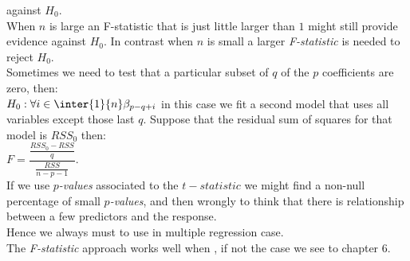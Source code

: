 against $H_{0}$.\\When $n$ is large an F-statistic that is just little
larger than $1$ might still provide evidence against $H_{0}$. In 
contrast when $n$ is small a larger \emph{F-statistic} is needed to
reject $H_{0}$.\\
Sometimes we need to test that a particular subset of $q$ of the $p$
coefficients are zero, then:\\$H_{0}:\forall i\in\inter{1}{n} 
\beta_{p-q+i}$ in this case we fit a second model that uses all 
variables except those last $q$. Suppose that the residual sum of 
squares for that model is $RSS_{0}$ then:\\$F=\dfrac{\frac{RSS_{0}-RSS}
{q}}{\frac{RSS}{n-p-1}}$.\\If we use \emph{$p$-values} associated to the
$t-statistic$ we might find a non-null percentage of small \emph{
$p$-values}, and then wrongly to think that there is relationship
between a few predictors and the response.\\Hence we always must to use
\emph{} in multiple regression
case.\\The \emph{F-statistic} approach works well when \emph{}, if not the
case we  see to chapter $6$.\\

